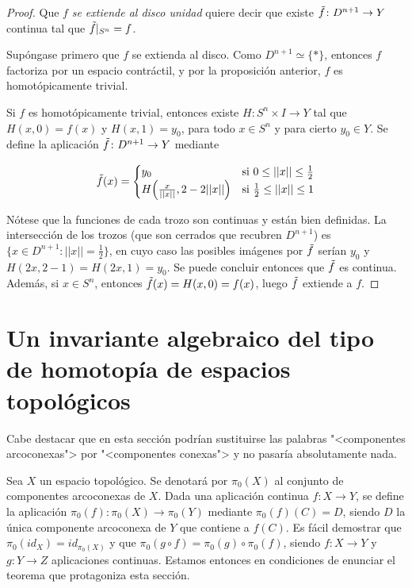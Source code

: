 \documentclass[11pt]{report}
\theoremstyle{definition}
\theoremstyle{definition}
\theoremstyle{remark}
\begin{document}
\begin{proof}
Que $f$ \textit{se extiende al disco unidad} quiere decir que existe $\Tilde{f} \colon D^{n+1} \to Y$ continua tal que $\Tilde{f} |_{S^n} = f$. 

\vspace{2mm}

Supóngase primero que $f$ se extienda al disco. Como $D^{n+1} \simeq \{\ast\}$, entonces $f$ factoriza por un espacio contráctil, y por la proposición anterior, $f$ es homotópicamente trivial.

\vspace{2mm}

Si $f$ es homotópicamente trivial, entonces existe $H \colon S^n \times I \to Y$ tal que $H(x,0) = f(x)$ y $H(x,1) = y_0$, para todo $x \in S^n$ y para cierto $y_0 \in Y$. Se define la aplicación $\Tilde{f} \colon D^{n+1} \to Y$ mediante

\[\Tilde{f}(x) = \begin{cases}
        y_0 & $si$ \ 0 \leq ||x|| \leq \frac{1}{2} \\
        H\Bigl(\frac{x}{||x||}, 2-2||x||\Bigr) & $si$ \ \frac{1}{2} \leq ||x|| \leq 1
\end{cases}\]

Nótese que la funciones de cada trozo son continuas y están bien definidas. La intersección de los trozos (que son cerrados que recubren $D^{n+1}$) es $\{x \in D^{n+1} \colon ||x|| = \frac{1}{2}\}$, en cuyo caso las posibles imágenes por $\Tilde{f}$ serían $y_0$ y $H(2x, 2-1) = H(2x,1) = y_0$. Se puede concluir entonces que $\Tilde{f}$ es continua. Además, si $x \in S^n$, entonces $\Tilde{f}(x) = H(x,0) = f(x)$, luego $\Tilde{f}$ extiende a $f$.
\end{proof}

\section{Un invariante algebraico del tipo de homotopía de espacios topológicos}

Cabe destacar que en esta sección podrían sustituirse las palabras "<componentes arcoconexas"> por "<componentes conexas"> y no pasaría absolutamente nada.

\vspace{2mm}

Sea $X$ un espacio topológico. Se denotará por $\pi_0(X)$ al conjunto de componentes arcoconexas de $X$. Dada una aplicación continua $f \colon X \to Y$, se define la aplicación $\pi_0(f) \colon \pi_0(X) \to \pi_0(Y)$ mediante $\pi_0(f)(C) = D$, siendo $D$ la única componente arcoconexa de $Y$ que contiene a $f(C)$. Es fácil demostrar que $\pi_0(id_X) = id_{\pi_0(X)}$ y que $\pi_0(g \circ f) = \pi_0(g) \circ \pi_0(f)$, siendo $f \colon X \to Y$ y $g \colon Y \to Z$ aplicaciones continuas. Estamos entonces en condiciones de enunciar el teorema que protagoniza esta sección.
\end{document}
